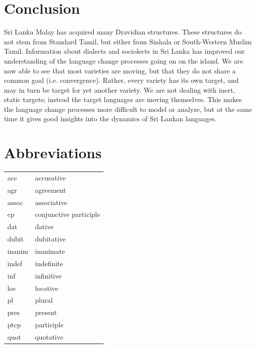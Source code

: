 \documentclass{article}
\begin{document}

% 





\section{Conclusion}
Sri Lanka Malay has acquired many Dravidian structures. These structures do not stem from Standard Tamil, but either from Sinhala or South-Western Muslim Tamil.
Information about dialects and sociolects in Sri Lanka has improved our understanding of the language change processes going on on the island. We are now able to see that most varieties are moving, but that they do not share a common goal (i.e. convergence). Rather, every variety has its own target, and may in turn be target for yet another variety. We are not dealing with inert, static targets; instead the target languages are moving themselves. This makes the language change processes more difficult to model or analyze, but at the same time it gives good insights into the dynamics of Sri Lankan languages. 


 

\section*{Abbreviations}
\begin{tabular}{>{\sc}ll}
acc &  accusative\\
agr &  agreement \\
assoc & associative \\
cp  &    conjunctive participle\\
dat &  dative \\
dubit &  dubitative \\
inanim  & inanimate \\
indef  & indefinite\\ 
inf &  infinitive\\  
loc  & locative\\ 
pl &  plural \\
pres &  present \\
ptcp  & participle\\ 
quot &  quotative \\ 
\end{tabular}
\end{document}
